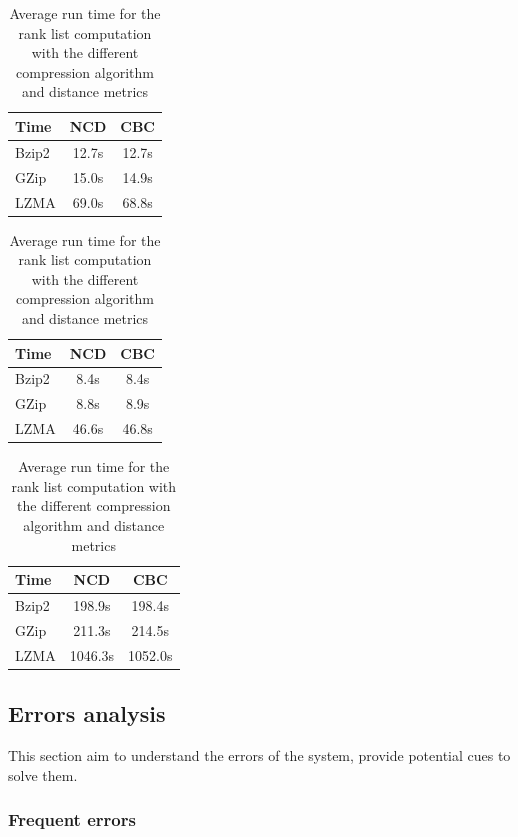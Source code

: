\begin{table}
  \centering
  \caption{Average run time for the rank list computation with the different compression algorithm and distance metrics}
  \label{tab:compression_evaluation_times}

  \label{tab:compression_evaluation_time_oxquarry}
  \begin{tabular}{l c c}
    \toprule
    Time      & NCD   & CBC \\
    \midrule
    Bzip2     & 12.7s & 12.7s \\
    GZip      & 15.0s & 14.9s \\
    LZMA      & 69.0s & 68.8s \\
    \bottomrule
  \end{tabular}

  \label{tab:compression_evaluation_time_brunet}
  \begin{tabular}{l c c}
    \toprule
    Time      & NCD   & CBC \\
    \midrule
    Bzip2     & 8.4s & 8.4s \\
    GZip      & 8.8s & 8.9s \\
    LZMA      & 46.6s & 46.8s \\
    \bottomrule
  \end{tabular}

  \label{tab:compression_evaluation_time_st_jean}
  \begin{tabular}{l c c}
    \toprule
    Time      & NCD    & CBC \\
    \midrule
    Bzip2     & 198.9s  & 198.4s \\
    GZip      & 211.3s  & 214.5s \\
    LZMA      & 1046.3s & 1052.0s \\
    \bottomrule
  \end{tabular}
\end{table}

\subsection{Errors analysis}

This section aim to understand the errors of the system, provide potential cues to solve them.

\subsubsection{Frequent errors}
\label{sec:frequent_errors}

